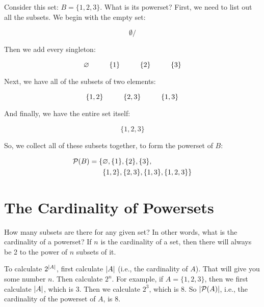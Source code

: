 \documentclass[../../../main.tex]{subfiles}
\begin{document}
\begin{example}

Consider this set: $B = \{ 1, 2, 3 \}$. What is its powerset? First, we need to list out all the subsets. We begin with the empty set: 

\begin{equation*}
  \emptyset/
\end{equation*}

Then we add every singleton:

\begin{equation*}
  \emptyset/ \hskip 1cm \{ 1 \} \hskip 1cm \{ 2 \} \hskip 1cm \{ 3 \}
\end{equation*}

Next, we have all of the subsets of two elements:

\begin{equation*}
  \{ 1, 2 \} \hskip 1cm \{ 2, 3 \} \hskip 1cm \{ 1, 3 \}
\end{equation*}

And finally, we have the entire set itself:

\begin{equation*}
  \{ 1, 2, 3 \}
\end{equation*}

So, we collect all of these subsets together, to form the powerset of $B$:

\begin{align*}
  \powerset{B} = \{ &\emptyset/, \{ 1 \}, \{ 2 \}, \{ 3 \}, \\
                    &\{ 1, 2 \}, \{ 2, 3 \}, \{ 1, 3 \}, \{ 1, 2, 3 \} \}
\end{align*}

\end{example}


\section{The Cardinality of Powersets}

How many subsets are there for any given set? In other words, what is the cardinality of a powerset? If $n$ is the cardinality of a set, then there will always be 2 to the power of $n$ subsets of it. 

\begin{aside}
  \begin{remark}
    To calculate $2^{|A|}$, first calculate $|A|$ (i.e., the cardinality of $A$). That will give you some number $n$. Then calculate $2^n$. For example, if $A = \{ 1, 2, 3 \}$, then we first calculate $|A|$, which is 3. Then we calculate $2^{3}$, which is 8. So $|\mathcal{P}(A)|$, i.e., the cardinality of the powerset of $A$, is 8.
  \end{remark}
\end{aside}
\end{document}
